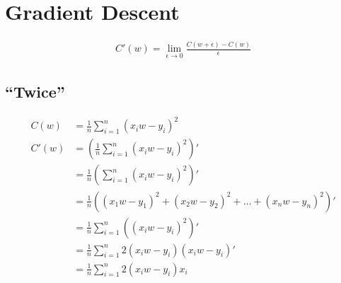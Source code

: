 \documentclass{article}
\begin{document}
\section{Gradient Descent}

\begin{align}
C'(w) = \lim_{\epsilon \to 0} \frac{C(w + \epsilon) - C(w)}{\epsilon}
\end{align}

\subsection{``Twice''}

\begin{align}
C(w) &= \frac{1}{n}\sum_{i=1}^{n}(x_i w - y_i)^2 \\
C'(w) &= \left(\frac{1}{n}\sum_{i=1}^{n}(x_i w - y_i)^2\right)' \\
      &= \frac{1}{n}\left(\sum_{i=1}^{n}(x_i w - y_i)^2\right)' \\
      &= \frac{1}{n}\left((x_1 w - y_1)^2 + (x_2 w - y_2)^2 + \hdots + (x_n w - y_n)^2\right)' \\
      &= \frac{1}{n}\sum_{i=1}^{n}\left((x_i w - y_i)^2\right)' \\
      &= \frac{1}{n}\sum_{i=1}^{n}2(x_i w - y_i)(x_i w - y_i)' \\
      &= \frac{1}{n}\sum_{i=1}^{n}2(x_i w - y_i)x_i
\end{align}
\end{document}
